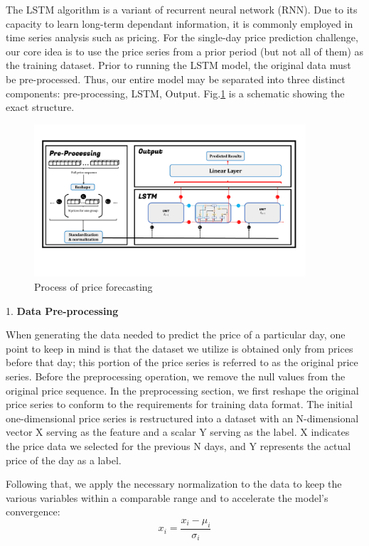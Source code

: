 \documentclass{mcmthesis}
\begin{document}
The LSTM algorithm is a variant of recurrent neural network (RNN). Due to its capacity to learn long-term dependant information, it is commonly employed in time series analysis such as pricing. For the single-day price prediction challenge, our core idea is to use the price series from a prior period (but not all of them) as the training dataset. Prior to running the LSTM model, the original data must be pre-processed. Thus, our entire model may be separated into three distinct components: pre-processing, LSTM, Output. Fig.\ref{fig:LSTM_model} is a schematic showing the exact structure.

\begin{figure}[H]	%
	\centering
	\includegraphics[width=0.9\textwidth]{LSTM_Fig}	%
	\caption{Process of price forecasting} \label{fig:LSTM_model}		%
\end{figure}
1. \textbf{Data Pre-processing}

When generating the data needed to predict the price of a particular day, one point to keep in mind is that the dataset we utilize is obtained only from prices before that day; this portion of the price series is referred to as the original price series. Before the preprocessing operation, we remove the null values from the original price sequence. In the preprocessing section, we first reshape the original price series to conform to the requirements for training data format. The initial one-dimensional price series is restructured into a dataset with an N-dimensional vector X serving as the feature and a scalar Y serving as the label. X indicates the price data we selected for the previous N days, and Y represents the actual price of the day as a label. 

Following that, we apply the necessary normalization to the data to keep the various variables within a comparable range and to accelerate the model's convergence:
\begin{equation}
	x_{i}=\frac{x_{i}-\mu_{i}}{\sigma_{i}}	
\end{equation}
\end{document}
